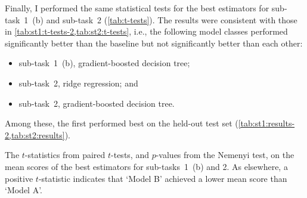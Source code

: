 \documentclass[11pt]{extarticle}
\begin{document}
Finally, I performed the same statistical tests for the best estimators for
sub-task~1~(b) and sub-task~2 (\cref{tab:t-tests}).
The results were consistent with those in
\cref{tab:st1:t-tests-2,tab:st2:t-tests}, i.e., the following model classes
performed significantly better than the baseline but not significantly better than
each other:
\begin{itemize}
  \item sub-task~1~(b), gradient-boosted decision tree;
  \item sub-task~2, ridge regression; and
  \item sub-task~2, gradient-boosted decision tree.
\end{itemize}
Among these, the first performed best on the held-out test set
(\cref{tab:st1:results-2,tab:st2:results}).

\begin{landscape}
  \begin{table}
    \centering
    \caption{The $t$-statistics from paired $t$-tests, and $p$-values from the Nemenyi test, on the
      mean scores of the best estimators for sub-tasks~1~(b) and 2.
      As elsewhere, a positive $t$-statistic indicates that `Model B' achieved a lower mean
      score than `Model A'.
    }
    \label{tab:t-tests}
  \end{table}
\end{landscape}

\printbibliography
\end{document}

